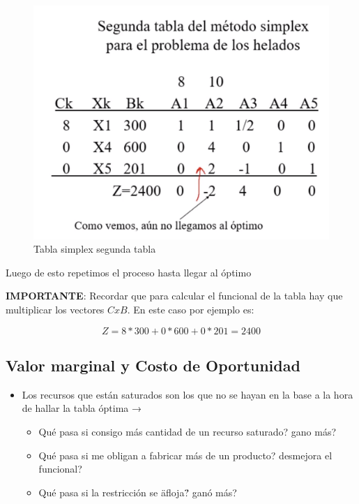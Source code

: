 \documentclass[titlepage,a4paper]{article}
\begin{document}
\begin{figure}[H]
    \centering
    \includegraphics[scale=0.33]{segunda_tabla_simplex.png}
    \caption{Tabla simplex segunda tabla}
\end{figure}


Luego de esto repetimos el proceso hasta llegar al óptimo

\textbf{IMPORTANTE}: Recordar que para calcular el funcional de la tabla hay que multiplicar los vectores $C x B$. En este caso por ejemplo es:

$$ Z = 8 * 300 + 0 * 600 + 0 * 201 = 2400 $$ 

\vspace{1cm}

\subsection{Valor marginal y Costo de Oportunidad}

\begin{itemize}
    \item Los recursos que están saturados son los que no se hayan en la base a la hora de hallar la tabla óptima →
    \begin{itemize}
        \item Qué pasa si consigo más cantidad de un recurso saturado? gano más?
        \item Qué pasa si me obligan a fabricar más de un producto? desmejora el funcional?
        \item Qué pasa si la restricción se \"afloja\"? ganó más?
    \end{itemize}
\end{itemize}
\end{document}
